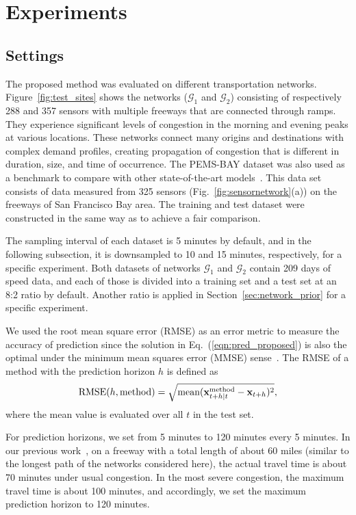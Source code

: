 \documentclass[journal]{IEEEtran}
\begin{document}
\section{Experiments}
\subsection{Settings}

The proposed method was evaluated on different transportation networks. Figure~\ref{fig:test_sites} shows the networks ($\mathcal{G}_1$ and $\mathcal{G}_2$) consisting of respectively 288 and 357 sensors with multiple freeways that are connected through ramps. They experience significant levels of congestion in the morning and evening peaks at various locations. 
These networks connect many origins and destinations with complex demand profiles, creating propagation of congestion that is different in duration, size, and time of occurrence. 
The PEMS-BAY dataset was also used as a benchmark to compare with other state-of-the-art models~\cite{li2018diffusion,wu2019graph}. This data set consists of data measured from 325 sensors (Fig.~\ref{fig:sensornetwork}(a)) on the freeways of San Francisco Bay area. The training and test dataset were constructed in the same way as \cite{li2018diffusion,wu2019graph} to achieve a fair comparison.

The sampling interval of each dataset is 5 minutes by default, and in the following subsection, it is downsampled to 10 and 15 minutes, respectively, for a specific experiment.
Both datasets of networks $\mathcal{G}_1$ and $\mathcal{G}_2$ contain 209 days of speed data, and each of those is divided into a training set and a test set at an 8:2 ratio by default.
Another ratio is applied in Section~\ref{sec:network_prior} for a specific experiment.



We used the root mean square error (RMSE) as an error metric to measure the accuracy of prediction since the solution in Eq.~(\ref{eqn:pred_proposed}) is also the optimal under the minimum mean squares error (MMSE) sense~\cite{kwak2020travel}.
The RMSE of a method with the prediction horizon $h$ is defined as
\begin{equation}
    \text{RMSE}(h,{\text{method}})=\sqrt{\text{mean}({\bf{x}}_{t+h|t}^{\text{method}}-{\bf{x}}_{t+h})^2},
\end{equation}
where the mean value is evaluated over all $t$ in the test set.


For prediction horizons, we set from 5 minutes to 120 minutes every 5 minutes. In our previous work~\cite{kwak2020travel}, on a freeway with a total length of about 60 miles (similar to the longest path of the networks considered here), the actual travel time is about 70 minutes under usual congestion. In the most severe congestion, the maximum travel time is about 100 minutes, and accordingly, we set the maximum prediction horizon to 120 minutes.
\end{document}
